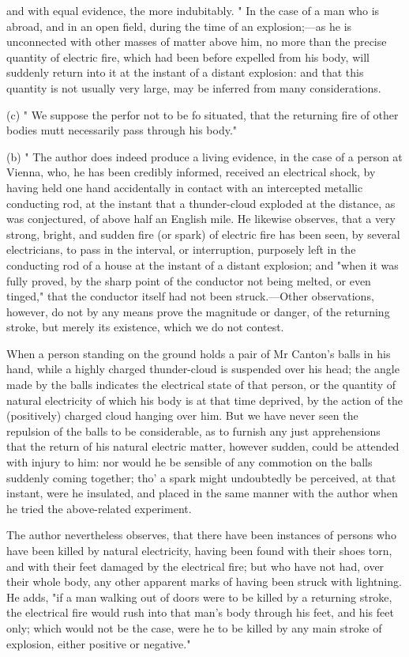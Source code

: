 \documentclass{article}
\begin{document}
and with equal evidence, the more indubitably.
" In the case of a man who is abroad, and in an open field, during the time of an explosion;—as he is unconnected with other masses of matter above him, no more than the precise quantity of electric fire, which had been before expelled from his body, will suddenly return into it at the instant of a distant explosion: and that this quantity is not usually very large, may be inferred from many considerations.

(c) " We suppose the perfor not to be fo situated, that the returning fire of other bodies mutt necessarily pass through his body."

(b) " The author does indeed produce a living evidence, in the case of a person at Vienna, who, he has been credibly informed, received an electrical shock, by having held one hand accidentally in contact with an intercepted metallic conducting rod, at the instant that a thunder-cloud exploded at the distance, as was conjectured, of above half an English mile. He likewise observes, that a very strong, bright, and sudden fire (or spark) of electric fire has been seen, by several electricians, to pass in the interval, or interruption, purposely left in the conducting rod of a house at the instant of a distant explosion; and "when it was fully proved, by the sharp point of the conductor not being melted, or even tinged," that the conductor itself had not been struck.—Other observations, however, do not by any means prove the magnitude or danger, of the returning stroke, but merely its existence, which we do not contest.

When a person standing on the ground holds a pair of Mr Canton's balls in his hand, while a highly charged thunder-cloud is suspended over his head; the angle made by the balls indicates the electrical state of that person, or the quantity of natural electricity of which his body is at that time deprived, by the action of the (positively) charged cloud hanging over him. But we have never seen the repulsion of the balls to be considerable, as to furnish any just apprehensions that the return of his natural electric matter, however sudden, could be attended with injury to him: nor would he be sensible of any commotion on the balls suddenly coming together; tho' a spark might undoubtedly be perceived, at that instant, were he insulated, and placed in the same manner with the author when he tried the above-related experiment.

The author nevertheless observes, that there have been instances of persons who have been killed by natural electricity, having been found with their shoes torn, and with their feet damaged by the electrical fire; but who have not had, over their whole body, any other apparent marks of having been struck with lightning. He adds, "if a man walking out of doors were to be killed by a returning stroke, the electrical fire would rush into that man's body through his feet, and his feet only; which would not be the case, were he to be killed by any main stroke of explosion, either positive or negative."
\end{document}

